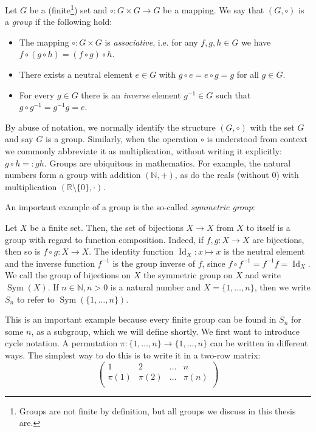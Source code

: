 \begin{defn}
 Let $G$ be a (finite\footnote{Groups are not finite by definition, but all groups we discuss in this thesis are.}) set and $ \circ : G \times G \rightarrow G$ be a mapping. 
We say that $(G, \circ)$ is a \emph{group} if the following hold:
\begin{itemize}
\item The mapping $\circ : G \times G$ is \emph{associative}, i.e. for any $f,g,h \in G$ we have $f \circ (g \circ h) = (f \circ g) \circ h$.
\item There exists a neutral element $e \in G$ with $g \circ e = e \circ g = g$ for all $g \in G$.
\item For every $g \in G$ there is an \emph{inverse} element $g^{-1} \in G$ such that $g \circ g^{-1} = g^{-1} g = e$.
\end{itemize}
\end{defn}
By abuse of notation, we normally identify the structure $(G,\circ)$ with the set $G$ and say $G$ is a group.
Similarly, when the operation $\circ$ is understood from context we commonly abbreviate it as multiplication, without writing it explicitly: $g \circ h =: gh$.
Groups are ubiquitous in mathematics. For example, the natural numbers form a group with addition $(\mathbb{N},+)$, as do the reals (without 0) with multiplication $(\mathbb{R}\setminus\{0\},\cdot)$.

An important example of a group is the so-called \emph{symmetric group}:
\begin{ex}
Let $X$ be a finite set.
Then, the set of bijections $X \rightarrow X$ from $X$ to itself is a group with regard to function composition.
Indeed, if $f,g : X \rightarrow X$ are bijections, then so is $f \circ g : X \rightarrow X$.
The identity function $\operatorname{Id}_X : x \mapsto x$ is the neutral element and the inverse function $f^{-1}$ is the group inverse of $f$,
since $f \circ f^{-1} = f^{-1} f = \operatorname{Id}_X.$ We call the group of bijections on $X$ the symmetric group on $X$ and write $\operatorname{Sym}(X)$.
If $n \in \mathbb{N}, n > 0$ is a natural number and $X = \{ 1 ,\ldots, n \}$, then we write $S_n$ to refer to $\operatorname{Sym}(\{1,\ldots,n\}).$
\end{ex}
This is an important example because every finite group can be found in $S_n$ for some $n$, as a subgroup, which we will define shortly.
We first want to introduce cycle notation. A permutation $\pi : \{ 1, \ldots, n \} \rightarrow \{ 1 , \ldots, n \}$ can be written in different ways.
The simplest way to do this is to write it in a two-row matrix:
\begin{equation*}
\left(
\begin{array}{cccc}
1 & 2 & \ldots & n \\
\pi(1) & \pi(2) & \ldots & \pi(n) \\
\end{array}
\right)
\end{equation*}

